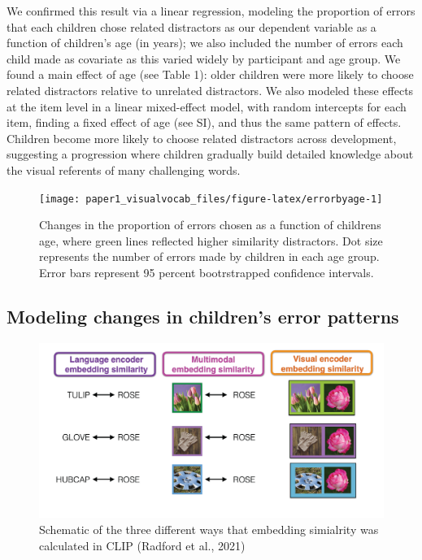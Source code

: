 \documentclass[
  man,mask]{apa6}
\begin{document}
We confirmed this result via a linear regression, modeling the proportion of errors that each children chose related distractors as our dependent variable as a function of children's age (in years); we also included the number of errors each child made as covariate as this varied widely by participant and age group. We found a main effect of age (see Table 1): older children were more likely to choose related distractors relative to unrelated distractors. We also modeled these effects at the item level in a linear mixed-effect model, with random intercepts for each item, finding a fixed effect of age (see SI), and thus the same pattern of effects. Children become more likely to choose related distractors across development, suggesting a progression where children gradually build detailed knowledge about the visual referents of many challenging words.

\begin{figure}[H]

{\centering \texttt{[image: paper1\_visualvocab\_files/figure-latex/errorbyage-1]} 

}

\caption{Changes in the proportion of errors chosen as a function of childrens age, where green lines reflected higher similarity distractors. Dot size represents the number of errors made by children in each age group. Error bars represent 95 percent bootrstrapped confidence intervals.}\label{fig:errorbyage}
\end{figure}

\subsection{Modeling changes in children's error patterns}\label{modeling-changes-in-childrens-error-patterns}

\begin{figure}[H]

{\centering \includegraphics[width=1\linewidth]{embedding_similarity} 

}

\caption{Schematic of the three different ways that embedding simialrity was calculated in CLIP (Radford et al., 2021)}\label{fig:clip-figure}
\end{figure}
\end{document}
